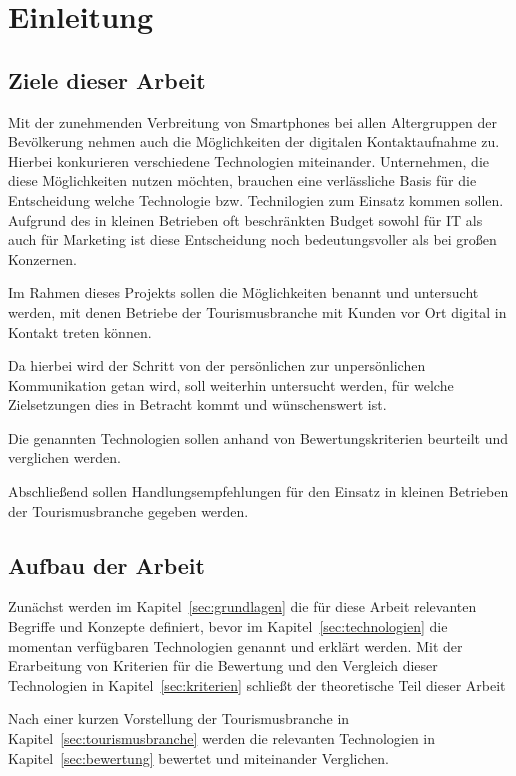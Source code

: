 \section{Einleitung}
\label{sec:einleitung}


\subsection{Ziele dieser Arbeit}

Mit der zunehmenden Verbreitung von Smartphones bei allen Altergruppen der Bevölkerung nehmen auch die Möglichkeiten der digitalen Kontaktaufnahme zu. Hierbei konkurieren verschiedene Technologien miteinander. Unternehmen, die diese Möglichkeiten nutzen möchten, brauchen eine verlässliche Basis für die Entscheidung welche Technologie bzw. Technilogien zum Einsatz kommen sollen. Aufgrund des in kleinen Betrieben oft beschränkten Budget sowohl für IT als auch für Marketing ist diese Entscheidung noch bedeutungsvoller als bei großen Konzernen.

Im Rahmen dieses Projekts sollen die Möglichkeiten benannt und untersucht werden, mit denen Betriebe der Tourismusbranche mit Kunden vor Ort digital in Kontakt treten können. 

Da hierbei wird der Schritt von der persönlichen  zur unpersönlichen Kommunikation getan wird, soll weiterhin untersucht werden, für welche Zielsetzungen dies in Betracht kommt und wünschenswert ist.

Die genannten Technologien sollen anhand von Bewertungskriterien beurteilt und verglichen werden.

Abschließend sollen Handlungsempfehlungen für den Einsatz in kleinen Betrieben der Tourismusbranche gegeben werden.


\subsection{Aufbau der Arbeit}

Zunächst werden im Kapitel~\ref{sec:grundlagen} die für diese Arbeit relevanten Begriffe und Konzepte definiert, bevor im Kapitel~\ref{sec:technologien} die momentan verfügbaren Technologien genannt und erklärt werden. Mit der Erarbeitung von Kriterien für die Bewertung und den Vergleich dieser Technologien in Kapitel~\ref{sec:kriterien} schließt der theoretische Teil dieser Arbeit 

Nach einer kurzen Vorstellung der Tourismusbranche in Kapitel~\ref{sec:tourismusbranche} werden die relevanten Technologien in Kapitel~\ref{sec:bewertung} bewertet und miteinander Verglichen.


